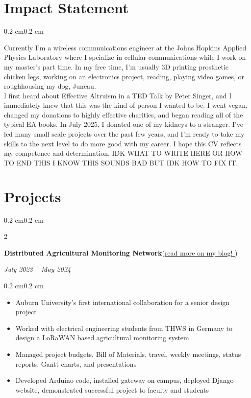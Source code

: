 \documentclass[10pt, letterpaper]{article}
\newenvironment{highlights}{
    \begin{itemize}[topsep=0.10 cm,parsep=0.10 cm,partopsep=0pt,itemsep=0pt,leftmargin=0.4 cm + 10pt]
}{
    \end{itemize}
}
\newenvironment{onecolentry}{
    \begin{adjustwidth}{0.2 cm}{0.2 cm}
}{
    \end{adjustwidth}
}
\newenvironment{twocolentry}[2][]{
    \onecolentry
    \def\secondColumn{#2}
    \setcolumnwidth{\fill, 4.5 cm}
    \begin{paracol}{2}
}{
    \switchcolumn \raggedleft \secondColumn
    \end{paracol}
    \endonecolentry
}
\let\hrefWithoutArrow\href
\renewcommand{\href}[2]{\hrefWithoutArrow{#1}{#2 \raisebox{.15ex}{\footnotesize \faExternalLink*}}}
\begin{document}
    \section{Impact Statement}
        \begin{onecolentry}
            Currently I'm a wireless communications engineer at the Johns Hopkins Applied Physics Laboratory where I speialize in cellular communications while I work on my 
            master's part time. In my free time, I'm usually 3D printing prosthetic chicken legs, working on an electronics project, reading, playing video games, or roughhousing
            my dog, Juneau. \\
            I first heard about Effective Altruism in a TED Talk by Peter Singer, and I immediately knew that this was the kind of person I wanted to be. I went vegan, 
            changed my donations to highly effective charities, and began reading all of the typical EA books. In July 2025, I donated one of my kidneys to a stranger. 
            I've led many small scale projects over the past few years, and I'm ready to take my skills to the next level to do more good with my career. I hope this CV 
            reflects my competence and determination. IDK WHAT TO WRITE HERE OR HOW TO END THIS I KNOW THIS SOUNDS BAD BUT IDK HOW TO FIX IT.
        \end{onecolentry}

    \vspace{0.3 cm - 0.3 cm}
    \section{Projects}
        \begin{twocolentry}{\textit{July 2023 – May 2024}}
            \textbf{Distributed Agricultural Monitoring Network}(\href{https://elijahparker000.com/blog/2024/DNAM-Conclusion/}{read more on my blog!})
        \end{twocolentry}
        \vspace{0.10 cm}
        \begin{onecolentry}
            \begin{highlights}
                \item Auburn University's first international collaboration for a senior design project
                \item Worked with electrical engineering students from THWS in Germany to design a LoRaWAN based agricultural monitoring system
                \item Managed project budgets, Bill of Materials, travel, weekly meetings, status reports, Gantt charts, and presentations
                \item Developed Arduino code, installed gateway on campus, deployed Django website, demonstrated successful project to faculty and students
            \end{highlights}
        \end{onecolentry}
\end{document}

